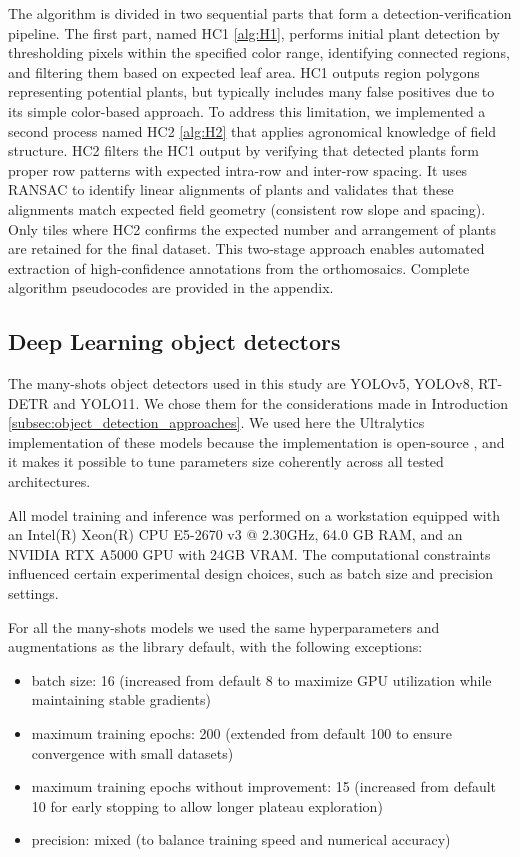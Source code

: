 \documentclass[journal,article,submit,pdftex,moreauthors]{Definitions/mdpi}
\begin{document}
The algorithm is divided in two sequential parts that form a detection-verification pipeline. The first part,
named HC1 \cref{alg:H1}, performs initial plant detection by thresholding pixels within the specified color range, 
identifying connected regions, and filtering them based on expected leaf area. HC1 outputs region polygons
representing potential plants, but typically includes many false positives due to its simple color-based approach.
To address this limitation, we implemented a second process named HC2 \cref{alg:H2} that applies agronomical 
knowledge of field structure. HC2 filters the HC1 output by verifying that detected plants form proper row 
patterns with expected intra-row and inter-row spacing. It uses RANSAC to identify linear alignments of plants 
and validates that these alignments match expected field geometry (consistent row slope and spacing).
Only tiles where HC2 confirms the expected number and arrangement of plants are retained for the final dataset.
This two-stage approach enables automated extraction of high-confidence annotations from the orthomosaics.
Complete algorithm pseudocodes are provided in the appendix.

\subsection{Deep Learning object detectors}

The many-shots object detectors used in this study are YOLOv5, YOLOv8, RT-DETR and YOLO11.
We chose them for the considerations made in Introduction \cref{subsec:object_detection_approaches}.
We used here the Ultralytics implementation of these models because the implementation is open-source \cite{jocherGitHubUltralyticsYOLO2023},
and it makes it possible to tune parameters size coherently across all tested architectures.

All model training and inference was performed on a workstation equipped with an Intel(R) Xeon(R) 
CPU E5-2670 v3 @ 2.30GHz, 64.0 GB RAM, and an NVIDIA RTX A5000 GPU with 24GB VRAM. 
The computational constraints influenced certain experimental design choices, such as 
batch size and precision settings.

For all the many-shots models we used the same hyperparameters and augmentations as the
library default, with the following exceptions:

\begin{itemize}
  \item batch size: 16 (increased from default 8 to maximize GPU utilization while maintaining stable gradients)
  \item maximum training epochs: 200 (extended from default 100 to ensure convergence with small datasets)
  \item maximum training epochs without improvement: 15 (increased from default 10 for early stopping to allow longer plateau exploration)
  \item precision: mixed (to balance training speed and numerical accuracy)
\end{itemize}
\end{document}
